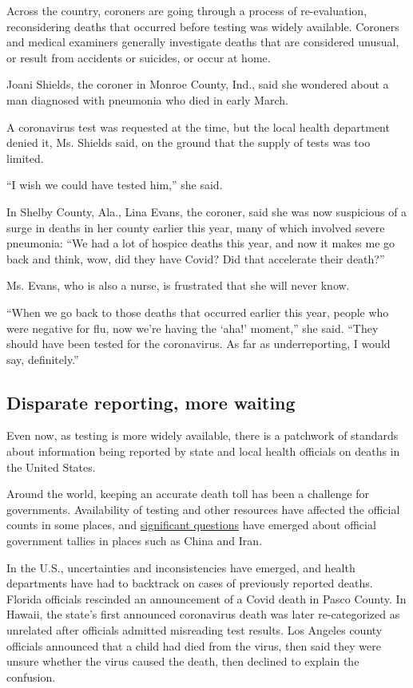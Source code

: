 Across the country, coroners are going through a process of
re-evaluation, reconsidering deaths that occurred before testing was
widely available. Coroners and medical examiners generally investigate
deaths that are considered unusual, or result from accidents or
suicides, or occur at home.

Joani Shields, the coroner in Monroe County, Ind., said she wondered
about a man diagnosed with pneumonia who died in early March.

A coronavirus test was requested at the time, but the local health
department denied it, Ms. Shields said, on the ground that the supply of
tests was too limited.

``I wish we could have tested him,'' she said.

In Shelby County, Ala., Lina Evans, the coroner, said she was now
suspicious of a surge in deaths in her county earlier this year, many of
which involved severe pneumonia: ``We had a lot of hospice deaths this
year, and now it makes me go back and think, wow, did they have Covid?
Did that accelerate their death?''

Ms. Evans, who is also a nurse, is frustrated that she will never know.

``When we go back to those deaths that occurred earlier this year,
people who were negative for flu, now we're having the `aha!' moment,''
she said. ``They should have been tested for the coronavirus. As far as
underreporting, I would say, definitely.''

\hypertarget{disparate-reporting-more-waiting}{%
\subsection{Disparate reporting, more
waiting}\label{disparate-reporting-more-waiting}}

Even now, as testing is more widely available, there is a patchwork of
standards about information being reported by state and local health
officials on deaths in the United States.

Around the world, keeping an accurate death toll has been a challenge
for governments. Availability of testing and other resources have
affected the official counts in some places, and
\href{https://www.nytimes.com/2020/04/02/us/politics/cia-coronavirus-china.html}{significant
questions} have emerged about official government tallies in places such
as China and Iran.

In the U.S., uncertainties and inconsistencies have emerged, and health
departments have had to backtrack on cases of previously reported
deaths. Florida officials rescinded an announcement of a Covid death in
Pasco County. In Hawaii, the state's first announced coronavirus death
was later re-categorized as unrelated after officials admitted
misreading test results. Los Angeles county officials announced that a
child had died from the virus, then said they were unsure whether the
virus caused the death, then declined to explain the confusion.

